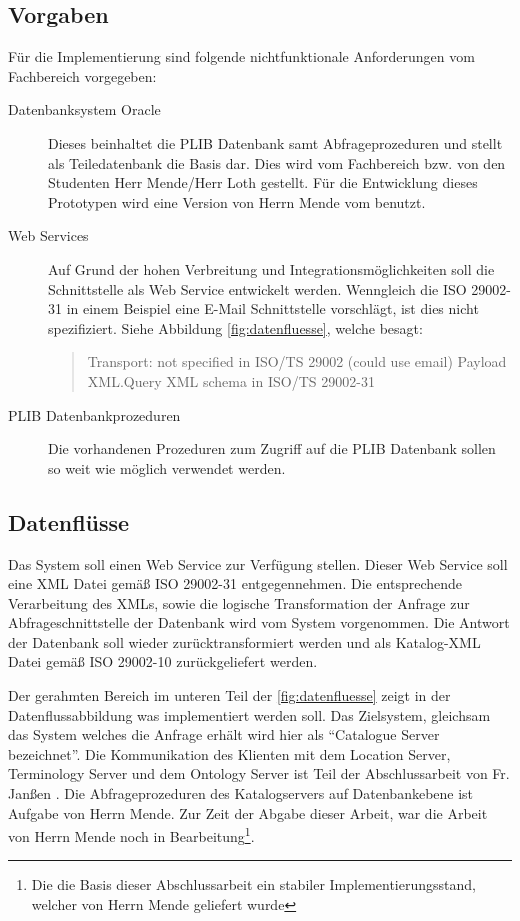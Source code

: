 \subsection{Vorgaben}

Für die Implementierung sind folgende nichtfunktionale Anforderungen vom Fachbereich vorgegeben:
\begin{description}
\item[Datenbanksystem Oracle] Dieses beinhaltet die PLIB Datenbank samt Abfrageprozeduren und stellt als Teiledatenbank die Basis dar. Dies wird vom Fachbereich bzw. von den Studenten Herr Mende/Herr Loth gestellt. Für die Entwicklung dieses Prototypen wird eine Version von Herrn Mende vom  benutzt.  
\item[Web Services] Auf Grund der hohen Verbreitung und Integrationsmöglichkeiten soll die Schnittstelle als Web Service entwickelt werden. Wenngleich die ISO 29002-31 in einem Beispiel eine E-Mail Schnittstelle vorschlägt, ist dies nicht spezifiziert. Siehe Abbildung \autoref{fig:datenfluesse}, welche besagt:
\begin{quotation}
Transport: not specified in ISO/TS 29002 (could use email) Payload XML.Query XML schema in ISO/TS 29002-31
\end{quotation}
\item[PLIB Datenbankprozeduren] Die vorhandenen Prozeduren zum Zugriff auf die PLIB Datenbank sollen so weit wie möglich verwendet werden. 
\end{description}

\subsection{Datenflüsse}
Das System soll einen Web Service zur Verfügung stellen. Dieser Web Service soll eine XML Datei gemäß ISO 29002-31 entgegennehmen. Die entsprechende Verarbeitung des XMLs, sowie die logische Transformation der Anfrage zur Abfrageschnittstelle der Datenbank wird vom System vorgenommen. Die Antwort der Datenbank soll wieder zurücktransformiert werden und als Katalog-XML Datei gemäß ISO 29002-10 zurückgeliefert werden.
 
Der gerahmten Bereich im unteren Teil der \autoref{fig:datenfluesse} zeigt in der Datenflussabbildung was implementiert werden soll. Das Zielsystem, gleichsam das System welches die Anfrage erhält wird hier als \enquote{Catalogue Server bezeichnet}. 
Die Kommunikation des Klienten mit dem Location Server, Terminology Server und dem Ontology Server ist Teil der Abschlussarbeit von Fr. Janßen \citep[Vergl.][]{janssen}. 
Die Abfrageprozeduren des Katalogservers auf Datenbankebene ist Aufgabe von Herrn Mende. Zur Zeit der Abgabe dieser Arbeit, war die Arbeit von Herrn Mende noch in Bearbeitung\footnote{Die die Basis dieser Abschlussarbeit ein stabiler Implementierungsstand, welcher von Herrn Mende geliefert wurde}. 

